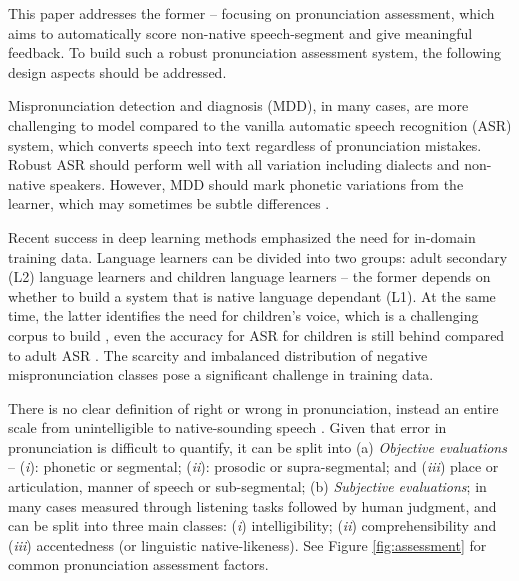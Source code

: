 \documentclass[11pt]{article}
\begin{document}
This paper addresses the former -- focusing on 
pronunciation assessment, which aims to automatically score non-native speech-segment and give meaningful feedback.
To build such a robust pronunciation assessment system, 
the following design aspects should be addressed.
\begin{description}[leftmargin=*] %
    \item  [Modelling] Mispronunciation detection and diagnosis (MDD), in many cases, are more challenging to model compared to the vanilla automatic speech recognition (ASR) system, which converts speech into text regardless of pronunciation mistakes. Robust ASR should perform well with all variation including dialects and non-native speakers. However, MDD should mark phonetic variations from the learner, which may sometimes be subtle differences \cite{li2016mispronunciation}.
    \item [Training Resources] Recent success in deep learning methods emphasized the need for in-domain training data. Language learners can be divided into two groups: adult secondary (L2) language learners and children language learners -- the former depends on whether to build a system that is native language dependant (L1). At the same time, the latter identifies the need for children's voice, which is a challenging corpus to build \cite{council2019improving, venkatasubramaniam2023end}, even the accuracy for ASR for children is still behind compared to adult ASR \cite {44268}. The scarcity and imbalanced distribution of negative mispronunciation classes pose a significant challenge in training data.
    \item [Evaluation] There is no clear definition of right or wrong in pronunciation, instead an entire scale from unintelligible to native-sounding speech \cite{witt2012automatic}. Given that error in pronunciation is difficult to quantify, it can be split into (a) \textit{Objective evaluations} -- (\textit{i}): phonetic or segmental; (\textit{ii}): prosodic or supra-segmental; and (\textit{iii}) place or articulation, manner of speech or sub-segmental; (b) \textit{Subjective evaluations}; in many cases measured through listening tasks followed by human judgment, and can be split into three main classes: 
    (\textit{i}) intelligibility; (\textit{ii}) comprehensibility and (\textit{iii}) accentedness (or linguistic native-likeness). See Figure \ref{fig:assessment} for common pronunciation assessment factors.
\end{description}
\end{document}
